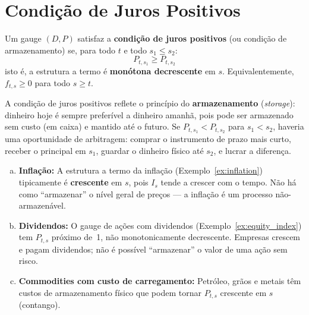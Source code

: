 \section{Condi\c{c}\~ao de Juros Positivos}

\begin{defi}\label{def:storage}
Um gauge $(D,P)$ satisfaz a \textbf{condi\c{c}\~ao de juros positivos}
(ou condi\c{c}\~ao de armazenamento) se, para todo $t$ e todo
$s_1 \leq s_2$:
\[
P_{t,s_1} \geq P_{t,s_2}
\]
isto \'e, a estrutura a termo \'e \textbf{mon\'otona decrescente} em
$s$. Equivalentemente, $f_{t,s} \geq 0$ para todo $s \geq t$.
\end{defi}

\begin{obs}
A condi\c{c}\~ao de juros positivos reflete o princ\'ipio do
\textbf{armazenamento} (\textit{storage}): dinheiro hoje \'e sempre
prefer\'ivel a dinheiro amanh\~a, pois pode ser armazenado sem custo
(em caixa) e mantido at\'e o futuro. Se $P_{t,s_1} < P_{t,s_2}$ para
$s_1 < s_2$, haveria uma oportunidade de arbitragem: comprar o
instrumento de prazo mais curto, receber o principal em $s_1$, guardar
o dinheiro f\'isico at\'e $s_2$, e lucrar a diferen\c{c}a.
\end{obs}

\begin{ex}
\begin{enumerate}[(a)]
 \item \textbf{Infla\c{c}\~ao:} A estrutura a termo da infla\c{c}\~ao
 (Exemplo~\ref{ex:inflation}) tipicamente \'e \textbf{crescente}
 em $s$, pois $I_s$ tende a crescer com o tempo. N\~ao h\'a
 como ``armazenar'' o n\'ivel geral de pre\c{c}os --- a
 infla\c{c}\~ao \'e um processo n\~ao-armazen\'avel.
 \item \textbf{Dividendos:} O gauge de a\c{c}\~oes com dividendos
 (Exemplo~\ref{ex:equity_index}) tem $P_{t,s}$ pr\'oximo de~1,
 n\~ao monotonicamente decrescente. Empresas crescem e pagam
 dividendos; n\~ao \'e poss\'ivel ``armazenar'' o valor de uma
 a\c{c}\~ao sem risco.
 \item \textbf{Commodities com custo de carregamento:} Petr\'oleo,
 gr\~aos e metais t\^em custos de armazenamento f\'isico que
 podem tornar $P_{t,s}$ crescente em $s$ (contango).
\end{enumerate}
\end{ex}

